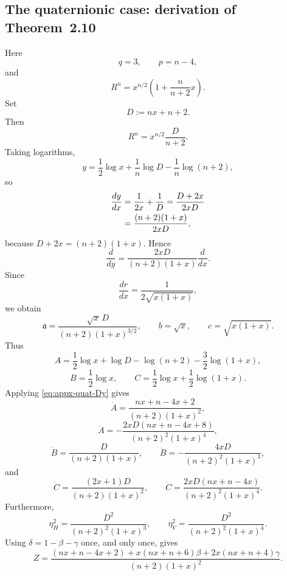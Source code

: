 \documentclass[11pt,reqno]{amsart}
\numberwithin{equation}{section}
\theoremstyle{definition}
\theoremstyle{remark}
\begin{document}
\subsection{The quaternionic case: derivation of Theorem~2.10}

Here
\[
q=3,\qquad p=n-4,
\]
and
\[
R^n=x^{n/2}\left(1+\frac{n}{n+2}x\right).
\]
Set
\[
D:=nx+n+2.
\]
Then
\begin{equation}
R^n=x^{n/2}\frac{D}{n+2}.
\label{eq:appx-quat-R}
\end{equation}
Taking logarithms,
\[
y=\frac{1}{2}\log x+\frac{1}n\log D-\frac{1}n\log(n+2),
\]
so
\begin{align}
\frac{dy}{dx}
&=\frac{1}{2x}+\frac{1}D
=\frac{D+2x}{2xD}\notag\\
&=\frac{(n+2)(1+x)}{2xD},
\label{eq:appx-quat-dydx}
\end{align}
because $D+2x=(n+2)(1+x)$.  Hence
\begin{equation}
\frac{d}{dy}
=\frac{2xD}{(n+2)(1+x)}\frac{d}{dx}.
\label{eq:appx-quat-Dy}
\end{equation}
Since
\[
\frac{dr}{dx}=\frac{1}{2\sqrt{x(1+x)}},
\]
we obtain
\begin{equation}
\mathfrak a
=\frac{\sqrt x\,D}{(n+2)(1+x)^{3/2}},
\qquad
b=\sqrt x,
\qquad
c=\sqrt{x(1+x)}.
\label{eq:appx-quat-abc}
\end{equation}
Thus
\[
A=\frac{1}{2}\log x+\log D-\log(n+2)-\frac{3}{2}\log(1+x),
\]
\[
B=\frac{1}{2}\log x,
\qquad
C=\frac{1}{2}\log x+\frac{1}{2}\log(1+x).
\]
Applying \eqref{eq:appx-quat-Dy} gives
\begin{equation}
\dot A=\frac{nx+n-4x+2}{(n+2)(1+x)^2},
\label{eq:appx-quat-Adot}
\end{equation}
\begin{equation}
\ddot A
=-\frac{2xD(nx+n-4x+8)}{(n+2)^2(1+x)^4},
\label{eq:appx-quat-Addot}
\end{equation}
\begin{equation}
\dot B=\frac{D}{(n+2)(1+x)},
\qquad
\ddot B=-\frac{4xD}{(n+2)^2(1+x)^3},
\label{eq:appx-quat-Bdots}
\end{equation}
and
\begin{equation}
\dot C=\frac{(2x+1)D}{(n+2)(1+x)^2},
\qquad
\ddot C=\frac{2xD(nx+n-4x)}{(n+2)^2(1+x)^4}.
\label{eq:appx-quat-Cdots}
\end{equation}
Furthermore,
\begin{equation}
\eta_H^2=\frac{D^2}{(n+2)^2(1+x)^3},
\qquad
\eta_V^2=\frac{D^2}{(n+2)^2(1+x)^4}.
\label{eq:appx-quat-eta}
\end{equation}
Using $\delta=1-\beta-\gamma$ once, and only once, gives
\begin{equation}
Z=\frac{
(nx+n-4x+2)
+x(nx+n+6)\beta
+2x(nx+n+4)\gamma
}{(n+2)(1+x)^2}.
\label{eq:appx-quat-Z}
\end{equation}
\end{document}
